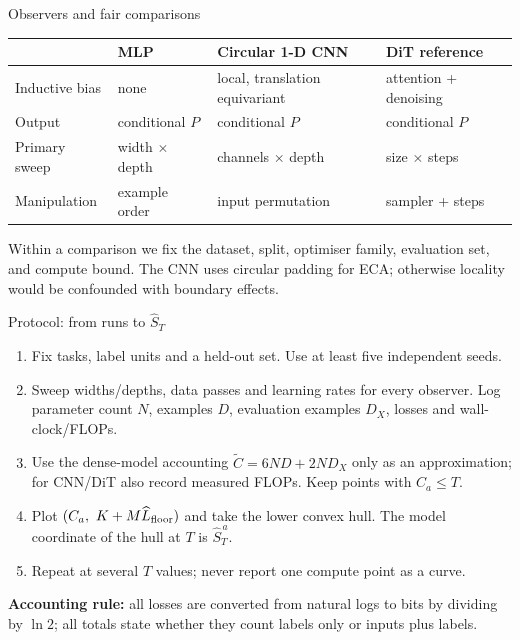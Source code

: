 \documentclass[aspectratio=43]{beamer}
\begin{document}
\begin{frame}{Observers and fair comparisons}
\begin{center}
\scriptsize
\setlength{\tabcolsep}{2pt}
\renewcommand{\arraystretch}{1.2}
\begin{tabular}{@{}>{\raggedright\arraybackslash}p{.18\linewidth}
  >{\raggedright\arraybackslash}p{.21\linewidth}
  >{\raggedright\arraybackslash}p{.31\linewidth}
  >{\raggedright\arraybackslash}p{.25\linewidth}@{}}
\toprule
 & MLP & Circular 1-D CNN & DiT reference \\
\midrule
Inductive bias & none & local, translation equivariant & attention + denoising \\
Output & conditional $P$ & conditional $P$ & conditional $P$ \\
Primary sweep & width $\times$ depth & channels $\times$ depth & size $\times$ steps \\
Manipulation & example order & input permutation & sampler + steps \\
\bottomrule
\end{tabular}
\end{center}

\medskip
Within a comparison we fix the dataset, split, optimiser family, evaluation set, and compute bound.
The CNN uses circular padding for ECA; otherwise locality would be confounded with boundary effects.
\end{frame}

\begin{frame}{Protocol: from runs to $\widehat S_T$}
\begin{enumerate}
\item Fix tasks, label units and a held-out set. Use at least five independent seeds.
\item Sweep widths/depths, data passes and learning rates for every observer. Log parameter count
      $N$, examples $D$, evaluation examples $D_X$, losses and wall-clock/FLOPs.
\item Use the dense-model accounting $\widetilde C=6ND+2ND_X$ only as an approximation; for CNN/DiT
      also record measured FLOPs. Keep points with $C_a\le T$.
\item Plot $(C_a,\ K+M\widehat L_{\rm floor})$ and take the lower convex hull. The model coordinate
      of the hull at $T$ is $\widehat S^{\,a}_T$.
\item Repeat at several $T$ values; never report one compute point as a curve.
\end{enumerate}

\medskip
\textbf{Accounting rule:} all losses are converted from natural logs to bits by dividing by $\ln 2$;
all totals state whether they count labels only or inputs plus labels.
\end{frame}
\end{document}
